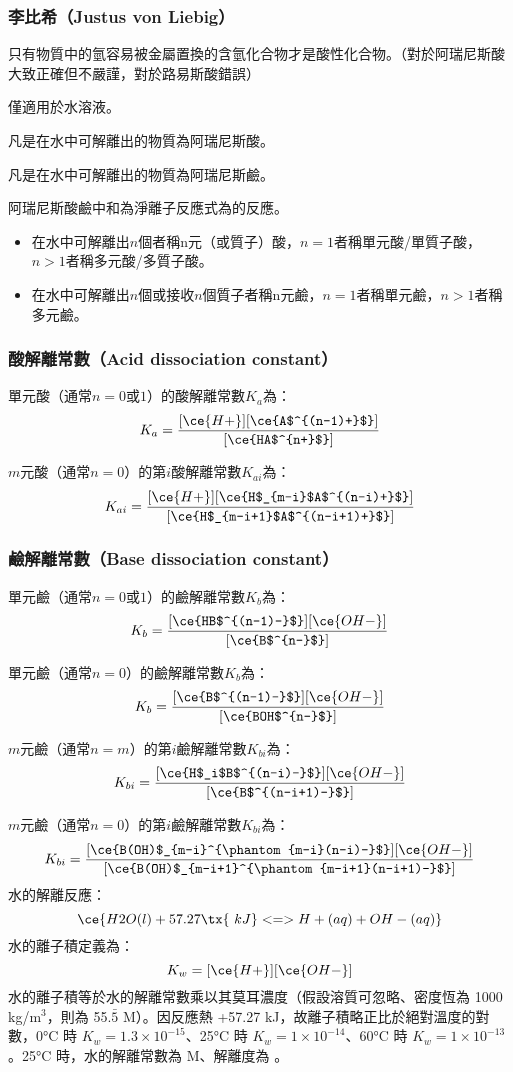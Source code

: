\documentclass[a4paper,12pt]{article}
\begin{document}
\subsubsection{李比希（Justus von Liebig）}
只有物質中的氫容易被金屬置換的含氫化合物才是酸性化合物。（對於阿瑞尼斯酸大致正確但不嚴謹，對於路易斯酸錯誤）
\bit
\item 僅適用於水溶液。
\item 凡是在水中可解離出的物質為阿瑞尼斯酸。
\item 凡是在水中可解離出的物質為阿瑞尼斯鹼。
\item 阿瑞尼斯酸鹼中和為淨離子反應式為的反應。
\eit
{}
\begin{itemize}
\item 在水中可解離出$n$個者稱n元（或質子）酸，$n=1$者稱單元酸/單質子酸，$n>1$者稱多元酸/多質子酸。
\item 在水中可解離出$n$個或接收$n$個質子者稱n元鹼，$n=1$者稱單元鹼，$n>1$者稱多元鹼。
\end{itemize}
\subsubsection{酸解離常數（Acid dissociation constant）}
單元酸（通常$n=0$或$1$）的酸解離常數$K_a$為：
\[K_a=\frac{[\ce{H+}][\ce{A$^{(n-1)+}$}]}{[\ce{HA$^{n+}$}]}\]

$m$元酸（通常$n=0$）的第$i$酸解離常數$K_{ai}$為：
\[K_{ai}=\frac{[\ce{H+}][\ce{H$_{m-i}$A$^{(n-i)+}$}]}{[\ce{H$_{m-i+1}$A$^{(n-i+1)+}$}]}\]
\subsubsection{鹼解離常數（Base dissociation constant）}
單元鹼（通常$n=0$或$1$）的鹼解離常數$K_b$為：
\[K_b=\frac{[\ce{HB$^{(n-1)-}$}][\ce{OH-}]}{[\ce{B$^{n-}$}]}\]

單元鹼（通常$n=0$）的鹼解離常數$K_b$為：
\[K_b=\frac{[\ce{B$^{(n-1)-}$}][\ce{OH-}]}{[\ce{BOH$^{n-}$}]}\]

$m$元鹼（通常$n=m$）的第$i$鹼解離常數$K_{bi}$為：
\[K_{bi}=\frac{[\ce{H$_i$B$^{(n-i)-}$}][\ce{OH-}]}{[\ce{B$^{(n-i+1)-}$}]}\]

$m$元鹼（通常$n=0$）的第$i$鹼解離常數$K_{bi}$為：
\[K_{bi}=\frac{[\ce{B(OH)$_{m-i}^{\phantom{m-i}(n-i)-}$}][\ce{OH-}]}{[\ce{B(OH)$_{m-i+1}^{\phantom{m-i+1}(n-i+1)-}$}]}\]
水的解離反應：
\[\ce{H2O(l) + 57.27\tx{\ kJ} <=> H+(aq) + OH-(aq)}\]
水的離子積定義為：
\[K_w = [\ce{H+}][\ce{OH-}]\]
水的離子積等於水的解離常數乘以其莫耳濃度（假設溶質可忽略、密度恆為 1000 kg/m$^3$，則為 55.$\bar{5}$ M）。因反應熱 +57.27 kJ，故離子積略正比於絕對溫度的對數，0°C 時 \( K_w = 1.3 \times 10^{-15} \)、25°C 時 \( K_w = 1 \times 10^{-14} \)、60°C 時 \( K_w = 1 \times 10^{-13} \)。25°C 時，水的解離常數為  M、解離度為 。
\end{document}
